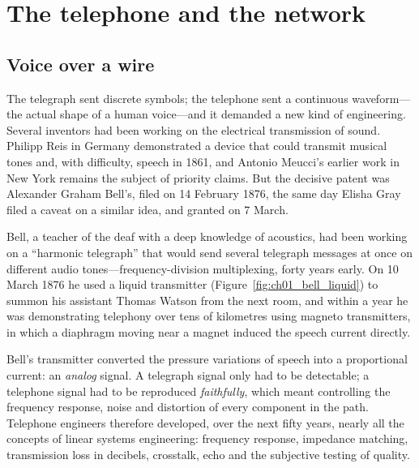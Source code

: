 \chOneNeed
\section{The telephone and the network}
\label{sec:ch01:telephone}

\subsection{Voice over a wire}

The telegraph sent discrete symbols; the telephone sent a continuous waveform---the actual shape of a
human voice---and it demanded a new kind of engineering. Several inventors had been working on the
electrical transmission of sound. Philipp Reis in Germany demonstrated a device that could transmit
musical tones and, with difficulty, speech in 1861, and Antonio Meucci's earlier work in New York
remains the subject of priority claims. But the decisive patent was Alexander Graham Bell's, filed on
14 February 1876, the same day Elisha Gray filed a caveat on a similar idea, and granted on 7 March.

Bell, a teacher of the deaf with a deep knowledge of acoustics, had been working on a ``harmonic
telegraph'' that would send several telegraph messages at once on different audio
tones---frequency-division multiplexing, forty years early. On 10 March 1876 he used a liquid
transmitter (Figure~\ref{fig:ch01_bell_liquid}) to summon his assistant Thomas Watson from the next room, and within a year he was
demonstrating telephony over tens of kilometres using magneto transmitters, in which a diaphragm
moving near a magnet induced the speech current directly.


Bell's transmitter converted the pressure variations of speech into a proportional current: an
\emph{analog} signal. A telegraph signal only had to be detectable; a telephone signal had to be
reproduced \emph{faithfully}, which meant controlling the frequency response, noise and distortion of
every component in the path. Telephone engineers therefore developed, over the next fifty years,
nearly all the concepts of linear systems engineering: frequency response, impedance matching,
transmission loss in decibels, crosstalk, echo and the subjective testing of quality.

